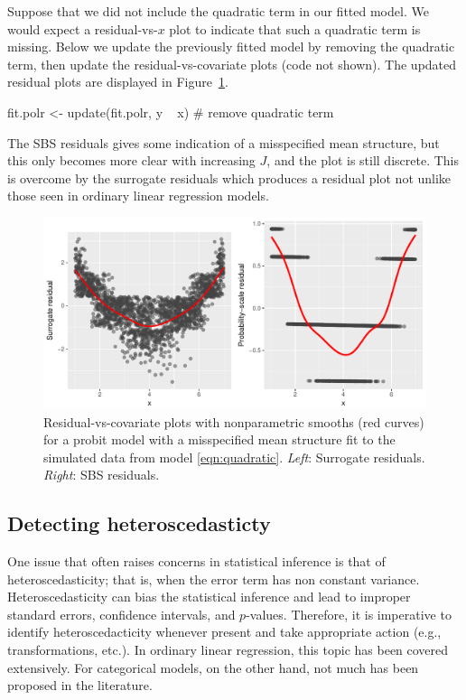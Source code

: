 Suppose that we did not include the quadratic term in our fitted model. We would expect a residual-vs-$x$ plot to indicate that such a quadratic term is missing. Below we update the previously fitted model by removing the quadratic term, then update the residual-vs-covariate plots (code not shown). The updated residual plots are displayed in Figure~\ref{fig:quadratic}.
\begin{example}
fit.polr <- update(fit.polr, y ~ x)  # remove quadratic term
\end{example}
The SBS residuals gives some indication of a misspecified mean structure, but this only becomes more clear with increasing $J$, and the plot is still discrete. This is overcome by the surrogate residuals which produces a residual plot not unlike those seen in ordinary linear regression models.

\begin{figure}[!htbp]
  \centering
  \includegraphics[width=1\textwidth]{quadratic}
  \caption{Residual-vs-covariate plots with nonparametric smooths (red curves) for a probit model with a misspecified mean structure fit to the simulated data from model \eqref{eqn:quadratic}. \textit{Left}: Surrogate residuals. \textit{Right}: SBS residuals.}
  \label{fig:quadratic}
\end{figure}


\subsection{Detecting heteroscedasticty}

One issue that often raises concerns in  statistical inference is that of heteroscedasticity; that is, when the error term has non constant variance. Heteroscedasticity can bias the statistical inference and lead to improper standard errors, confidence intervals, and $p$-values. Therefore, it is imperative to identify heteroscedacticity whenever present and take appropriate action (e.g., transformations, etc.). In ordinary linear regression, this topic has been covered extensively. For categorical models, on the other hand, not much has been proposed in the literature.

